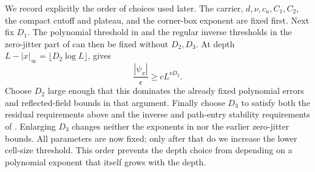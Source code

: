 We record explicitly the order of choices used later.  The carrier,
$d,\nu,c_u,C_1,C_2$, the compact cutoff and plateau, and the corner-box
exponent are fixed first.  Next fix $D_1$.  The polynomial threshold in
 and the regular inverse thresholds in the zero-jitter
part of  can then be fixed without $D_2,D_3$.
At depth $L-|x|_\infty=\lfloor D_2\log L\rfloor$,
 gives
\[
 \frac{|\psi_x|}{\epsilon}\ge cL^{\nu D_2}.
\]
Choose $D_2$ large enough that this dominates the already fixed
polynomial errors and reflected-field bounds in that argument.
Finally choose $D_3$ to satisfy both the residual requirements above and
the inverse and path-entry stability requirements of
.  Enlarging $D_3$ changes neither the exponents in
 nor the earlier zero-jitter bounds.  All parameters
are now fixed; only after that do we increase the lower cell-size
threshold.  This order prevents the depth choice from depending on a
polynomial exponent that itself grows with the depth.
